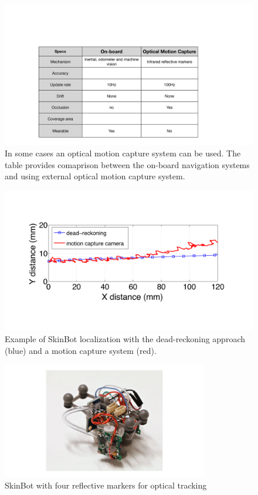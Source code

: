 \begin{figure}[!ht]
\centering
\includegraphics[width=13.0cm]{pictures/chapter5/tracking_methods_comparison.pdf}
\caption{In some cases an optical motion capture system can be used. The table provides comaprison between the on-board navigation systems and using external optical motion capture system.}
\label{fig:localization_comparison}
\end{figure}



\begin{figure}[!ht]
\centering
\includegraphics[width=13.0cm]{pictures/chapter5/skin_bot_localization_error.pdf}
\caption{Example of SkinBot localization with the dead-reckoning approach (blue) and a motion capture system (red).}
\label{fig:localization_skin_bot_error}
\end{figure}

\begin{figure}[!ht]
\centering
\includegraphics[width=9.0cm]{pictures/chapter5/skinbot_reflective_markers.pdf}
\caption{SkinBot with four reflective markers for optical tracking}
\label{fig:skinbot_reflective_markers}
\end{figure}




